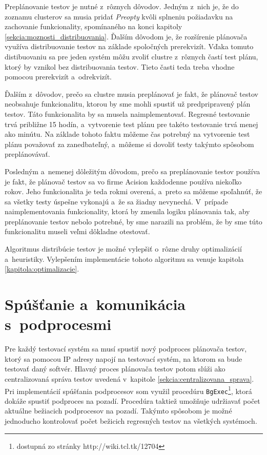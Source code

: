 Preplánovanie testov je nutné z~rôznych dôvodov. Jedným z~nich je, že do zoznamu clusterov 
sa musia pridať \textit{Preopty} kvôli splneniu požiadavku na zachovanie funkcionality, 
spomínaného na konci kapitoly \ref{sekcia:moznosti_distribuovania}.
Ďalším dôvodom je, že rozšírenie plánovača využíva distribuovanie testov na základe 
spoločných prerekvizít. Vďaka tomuto distibuovaniu sa pre jeden systém môžu zvoliť 
clustre z~rôznych častí test plánu, ktorý by vznikol bez distribuovania testov.
Tieto časti teda treba vhodne  pomocou prerekvizít a~odrekvizít. 

Ďalším z~dôvodov, prečo sa clustre musia preplánovať je fakt, že plánovač testov neobsahuje
funkcionalitu, ktorou by sme mohli spustiť už predpripravený plán testov.
Táto funkcionalita by sa musela naimplementovať. Regresné testovanie trvá približne 15 hodín, 
a~vytvorenie test plánu pre takéto testovanie trvá menej ako minútu.
Na základe tohoto faktu môžeme čas potrebný na vytvorenie test plánu považovať za zanedbateľný, a~môžeme
si dovoliť testy takýmto spôsobom preplánovávať.

Posledným a~nemenej dôležitým dôvodom, prečo sa preplánovanie testov používa je fakt,
že plánovač testov sa vo firme Acision každodenne používa niekoľko rokov.
Jeho funkcionalita je teda rokmi overená, a~preto sa môžeme spoľahnúť, 
že sa všetky testy úspešne vykonajú a~že sa žiadny nevynechá.
V~prípade naimplementovania funkcionality, ktorá by zmenila logiku plánovania tak,
aby preplánovanie testov nebolo potrebné, by sme narazili na problém, že by sme túto
funkcionalitu museli veľmi dôkladne otestovať. 

Algoritmus distribúcie testov je možné vylepšiť o~rôzne druhy optimalizácií a~heuristiky.
Vylepšením implementácie tohoto algoritmu sa venuje kapitola \ref{kapitola:optimalizacie}. 


\section{Spúšťanie a~komunikácia s~podprocesmi}
\label{sekcia:spustanie_podprocesov}
Pre každý testovací systém sa musí spustiť nový podproces plánovača testov,
ktorý sa pomocou IP adresy napojí na testovací systém, na ktorom sa bude testovať daný softvér.
Hlavný proces plánovača testov potom slúži ako centralizovaná správa testov uvedená
v~kapitole \ref{sekcia:centralizovana_sprava}.
Pri implementácií spúšťania podprocesov som využil procedúru \texttt{BgExec}\footnote{dostupná zo stránky http://wiki.tcl.tk/12704},
ktorá dokáže spustiť podproces na pozadí. Procedúra taktiež umožňuje udržiavať počet aktuálne bežiacich podprocesov na pozadí.
Takýmto spôsobom je možné jednoducho kontrolovať počet bežicich regresných testov na všetkých systémoch.

